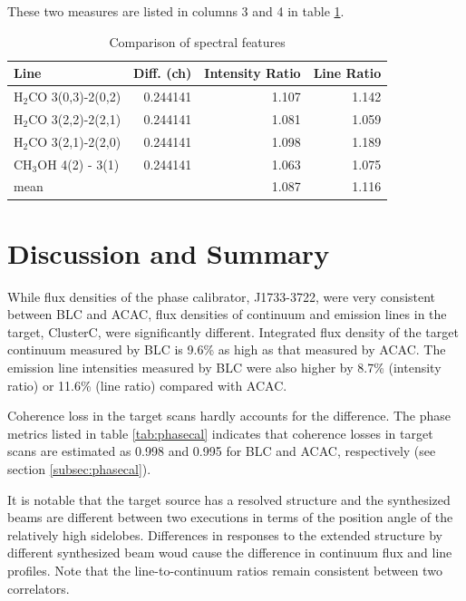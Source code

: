 \documentclass[a4paper, 10pt]{scrartcl}
\begin{document}
These two measures are listed in columns 3 and 4 in table \ref{tab:Spectra}.

\begin{table}[h]
\centering
\caption{Comparison of spectral features}
\label{tab:Spectra}
\begin{tabular}{lrrr} \hline \hline
Line        &  Diff. (ch)& Intensity Ratio & Line Ratio \\ \hline 
H$_2$CO 3(0,3)-2(0,2)  &  0.244141  & 1.107           & 1.142 \\
H$_2$CO 3(2,2)-2(2,1)  &  0.244141  & 1.081           & 1.059 \\
H$_2$CO 3(2,1)-2(2,0)  &  0.244141  & 1.098           & 1.189 \\
CH$_3$OH 4(2) - 3(1)   &  0.244141  & 1.063           & 1.075 \\ \hline
mean                   &            & 1.087           & 1.116 \\ \hline
\end{tabular}
\end{table}

\section{Discussion and Summary}
While flux densities of the phase calibrator, J1733-3722, were very consistent between BLC and ACAC, flux densities of continuum and emission lines in the target, ClusterC, were significantly different.
Integrated flux density of the target continuum measured by BLC is 9.6\% as high as that measured by ACAC.
The emission line intensities measured by BLC were also higher by 8.7\% (intensity ratio) or 11.6\% (line ratio) compared with ACAC.

Coherence loss in the target scans hardly accounts for the difference. The phase metrics listed in table \ref{tab:phasecal} indicates that coherence losses in target scans are estimated as 0.998 and 0.995 for BLC and ACAC, respectively (see section \ref{subsec:phasecal}).

It is notable that the target source has a resolved structure and the synthesized beams are different between two executions in terms of the position angle of the relatively high sidelobes.
Differences in responses to the extended structure by different synthesized beam woud cause the difference in continuum flux and line profiles. Note that the line-to-continuum ratios remain consistent between two correlators.
\end{document}
